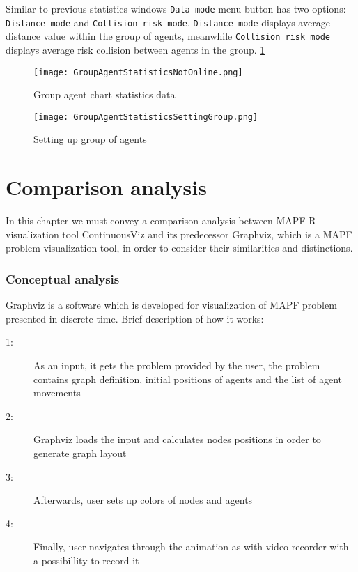 \documentclass[thesis=B,english]{FITthesis}[2019/12/23]
\begin{document}
Similar to previous statistics windows \verb|Data mode| menu button has two options: \verb|Distance mode| and \verb|Collision risk mode|. \verb|Distance mode| displays average distance value within the group of agents, meanwhile \verb|Collision risk mode| displays average risk collision between agents in the group. \ref{fig:float36}

\begin{figure}
	\texttt{[image: GroupAgentStatisticsNotOnline.png]}
	\caption[Online chart mode2]{Group agent chart statistics data}\label{fig:float36}
\end{figure}

\begin{figure}
	\texttt{[image: GroupAgentStatisticsSettingGroup.png]}
	\caption[Not Online chart mode2]{Setting up group of agents}\label{fig:float37}
\end{figure}



\chapter{Comparison analysis}

In this chapter we must convey a comparison analysis between MAPF-R visualization tool ContinuousViz and its predecessor Graphviz, which is a MAPF problem visualization tool, in order to consider their similarities and distinctions. 

\subsection{Conceptual analysis}

Graphviz is a software which is developed for visualization of MAPF problem presented in discrete time. Brief description of how it works:

\begin{description}
\item [1:]  As an input, it gets the problem provided by the user, the problem contains graph definition, initial positions of agents and the list of agent movements
\item [2:] Graphviz loads the input and calculates nodes positions in order to generate graph layout 
\item [3:] Afterwards, user sets up colors of nodes and agents
\item [4:] Finally, user navigates through the animation as with video recorder with a possibillity to record it\cite{bib_4}
\end{description}
\end{document}
